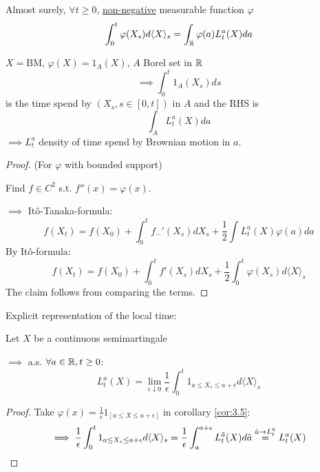 \begin{corollary}\label{cor:3.5}
    Almost surely, $\forall t\geq 0$, \underline{non-negative} measurable function $\varphi$
    \[\int_0^t\varphi(X_s)d\langle X\rangle_s=\int_{\mathbb{R}}\varphi (a)L_t^a(X)da\]
\end{corollary}

\begin{aexample}
    $X=$BM, $\varphi(X)=1_A(X)$, $A$ Borel set in $\mathbb{R}$
    \[\implies \int_0^t 1_A(X_s)ds\]
    is the time spend by $(X_s,s\in[0,t])$ in $A$ and the RHS is
    \[\int_A L_t^a(X)da\]
    $\implies L_t^a$ density of time spend by Brownian motion in $a$.
\end{aexample}

\begin{proof}
    (For $\varphi$ with bounded support)
    
    Find $f\in C^2$ s.t. $f''(x)=\varphi(x)$. 

    $\implies$ Itô-Tanaka-formula: 
    \[f(X_t)=f(X_0)+\int_0^t f_-'(X_s)dX_s+\frac{1}{2}\int L_t^a(X)\varphi(a)da\]
    By Itô-formula:
    \[f(X_t)=f(X_0)+\int_0^t f'(X_s)dX_s+\frac{1}{2}\int_0^t\varphi(X_s)d\langle X\rangle_s\]
    The claim follows from comparing the terms.
\end{proof}

Explicit representation of the local time:

\begin{lemma}\label{lem:3.6}
    Let $X$ be a continuous semimartingale

    $\implies$ a.s. $\forall a\in\mathbb{R},t\geq 0$:
    \[L_t^a(X)=\lim_{\epsilon\downarrow 0}\frac{1}{\epsilon}\int_0^t1_{a\leq X_s\leq a+\epsilon}d\langle X\rangle_s\]
\end{lemma}


\begin{proof}
    Take $\varphi(x)=\frac{1}{\epsilon}1_{[a\leq X\leq a+\epsilon]}$ in corollary \ref{cor:3.5}:
    \[\implies \frac{1}{\epsilon}\int_0^t1_{a\leq X_s\leq a+\epsilon}d\langle X\rangle_s=\frac{1}{\epsilon}\int_a^{a+\epsilon}L_t^{\tilde{a}}(X)d\tilde{a}\stackrel{\tilde{a}\to L_t^{\tilde{a}}}{=}L_t^a(X)\qedhere\]
\end{proof}

